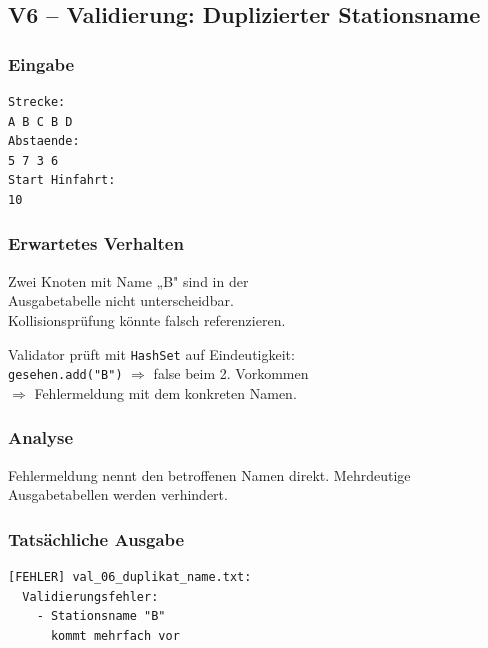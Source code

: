 \documentclass[12pt,a4paper]{article}
\begin{document}
\subsection{V6 – Validierung: Duplizierter Stationsname}
\label{test:v6}

\noindent
\begin{minipage}[t]{0.48\textwidth}
\scriptsize
\setlength{\tabcolsep}{2pt}

\subsubsection*{Eingabe}
\begin{lstlisting}
Strecke:
A B C B D
Abstaende:
5 7 3 6
Start Hinfahrt:
10
\end{lstlisting}

\subsubsection*{Erwartetes Verhalten}
Zwei Knoten mit Name „B" sind in der\\
Ausgabetabelle nicht unterscheidbar.\\
Kollisionsprüfung könnte falsch referenzieren.

\vspace{4pt}
Validator prüft mit \texttt{HashSet} auf Eindeutigkeit:\\
\texttt{gesehen.add("B")} $\Rightarrow$ false beim 2. Vorkommen\\
$\Rightarrow$ Fehlermeldung mit dem konkreten Namen.

\subsubsection*{Analyse}
Fehlermeldung nennt den betroffenen Namen direkt.
Mehrdeutige Ausgabetabellen werden verhindert.
\end{minipage}
\hfill
\begin{minipage}[t]{0.48\textwidth}
\scriptsize
\subsubsection*{Tatsächliche Ausgabe}
\begin{lstlisting}
[FEHLER] val_06_duplikat_name.txt:
  Validierungsfehler:
    - Stationsname "B"
      kommt mehrfach vor
\end{lstlisting}
\end{minipage}

\end{document}
